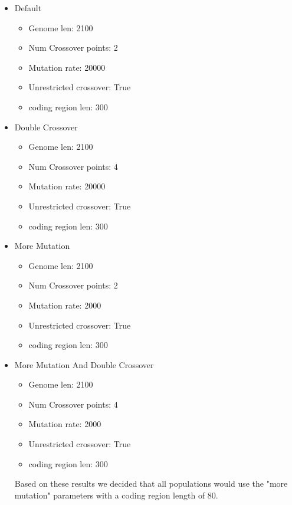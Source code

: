 \documentclass[11pt]{article}
\begin{document}
\begin{itemize}
\item Default
\label{sec:orgheadline27}

\begin{itemize}
\item Genome len: 2100
\item Num Crossover points: 2
\item Mutation rate: 20000
\item Unrestricted crossover: True
\item coding region len: 300
\end{itemize}

\item Double Crossover
\label{sec:orgheadline28}

\begin{itemize}
\item Genome len: 2100
\item Num Crossover points: 4
\item Mutation rate: 20000
\item Unrestricted crossover: True
\item coding region len: 300
\end{itemize}

\item More Mutation
\label{sec:orgheadline29}

\begin{itemize}
\item Genome len: 2100
\item Num Crossover points: 2
\item Mutation rate: 2000
\item Unrestricted crossover: True
\item coding region len: 300
\end{itemize}


\item More Mutation And Double Crossover
\label{sec:orgheadline30}
\begin{itemize}
\item Genome len: 2100
\item Num Crossover points: 4
\item Mutation rate: 2000
\item Unrestricted crossover: True
\item coding region len: 300
\end{itemize}


Based on these results we decided that all populations would use the "more mutation" parameters with a coding region length of 80.
\end{itemize}
\end{document}
